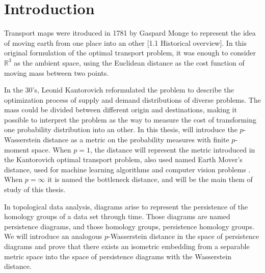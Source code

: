 \section{Introduction}

Transport maps were itroduced in 1781 by Gaspard Monge to represent the idea of moving earth from one place into an other \cite{Figalli}[1.1 Historical overview]. In this original formulation of the optimal transport problem, it was enough to consider $ \mathbb R^3 $ as the ambient space, using the Euclidean distance as the cost function of moving mass between two points.

In the 30's, Leonid Kantorovich reformulated the problem to describe the optimization process of supply and demand distributions of diverse problems. The mass could be divided between different origin and destinations, making it possible to interpret the problem as the way to measure the cost of transforming one probability distribution into an other. In this thesis, will introduce the $p$-Wasserstein distance as a metric on the probability measures with finite $p$-moment space. When $ p = 1 $, the distance will represent the metric introduced in the Kantorovich optimal transport problem, also used named Earth Mover's distance, used for machine learning algorithms and computer vision problems \cite{earth}. When $p = \infty $ it is named the bottleneck distance, and will be the main them of study of this thesis.

In topological data analysis, diagrams arise to represent the 
persistence of the homology groups of a data set through time. Those diagrams are named persistence diagrams, and those homology groups, persistence homology groups. We will introduce an analogous $p$-Wasserstein distance in the space of persistence diagrams and prove that there exists an isometric embedding  from a separable metric space into the space of persistence diagrams with the Wasserstein distance.